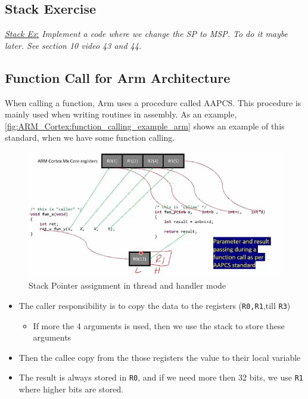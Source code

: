 \subsection{Stack Exercise}

 \underline{\textit{Stack Ex}:} \textit{Implement a code where we change the SP to MSP. To do it maybe later. See section 10 video 43 and 44.}


\subsection{Function Call for Arm Architecture}

When calling a function, Arm uses a procedure called AAPCS. This procedure is mainly used when writing routines in assembly. As an example, \autoref{fig:ARM_Cortex:function_calling_example_arm} shows an example of this standard, when we have some function calling.

\begin{figure}[h]
\centering
\includegraphics[scale=0.7]{Figures/ARM_Cortex/function_calling_example_arm}
\caption{Stack Pointer assignment in thread and handler mode}
\label{fig:ARM_Cortex:function_calling_example_arm}
\end{figure}

\begin{itemize}
    \item The caller responsibility is to copy the data to the registers (\verb|R0,R1|,till \verb|R3|)

    \begin{itemize}
        \item If more the 4 arguments is used, then we use the stack to store these arguments
    \end{itemize}


    \item  Then the callee copy from the those registers the value to their local variable

    \item  The result is always stored in \verb|R0|, and if we need more then 32 bits, we use \verb|R1| where higher bits are stored.
    
\end{itemize}


